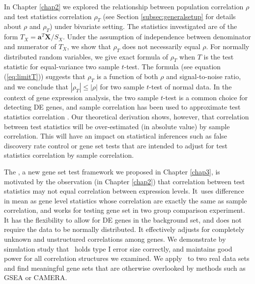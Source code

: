 In Chapter \ref{chap2} we explored the relationship between population correlation $\rho$ and test 
statistics correlation $\rho_T$ (see Section \ref{subsec:generalsetup} for details about $\rho$ and 
$\rho_T$) under bivariate setting. The statistics investigated are of the form $T_X = \bm a^T\bm 
X/S_X$. Under the assumption of independence between denominator and numerator of $T_X$, we show 
that $\rho_T$ does not necessarily equal $\rho$. For normally distributed 
random variables, we give exact formula of $\rho_T$ when $T$ is the test statistic for 
equal-variance two sample $t$-test. The formula (see equation (\ref{eq:limitT})) suggests that 
$\rho_T$ is a function of both $\rho$ and signal-to-noise ratio, and we conclude that $|\rho_T|\leq 
|\rho|$ for two sample $t$-test of normal data. In the context of gene expression analysis, the two 
sample $t$-test is a common choice for 
detecting DE genes, and sample correlation has been used to approximate test statistics 
correlation \cite{barry2008statistical,efron2007correlation,wu2012camera}. Our theoretical 
derivation shows, however, that correlation between test statistics will be over-estimated (in 
absolute value) by sample correlation. This will have an impact on statistical inferences such as 
false discovery rate control or gene set tests that are intended to adjust for test statistics 
correlation by sample correlation.

The \OurMethod, a new gene set test framework we proposed in Chapter \ref{chap3}, is motivated by 
the observation (in Chapter \ref{chap2}) that correlation between test statistics may not equal 
correlation between expression levels. It~uses difference in mean as gene level statistics 
whose correlation are exactly the same as sample correlation, and works for testing gene set in 
two group comparison experiment. It has the flexibility to allow for DE genes in the 
background set, and does not require the data to be normally distributed. It effectively adjusts 
for completely unknown and unstructured correlations among genes. 
 We demonstrate by simulation study that \OurMethod~holds type I error size 
correctly, and maintains good power for all correlation structures we examined. We apply 
\OurMethod~to two real data sets and find meaningful gene sets that are otherwise overlooked by 
methods such as GSEA or CAMERA.


